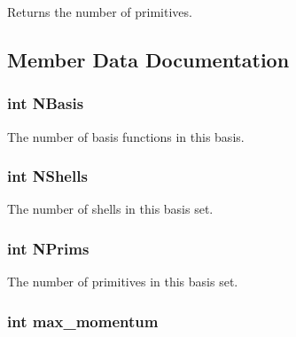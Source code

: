 Returns the number of primitives. 

\subsection{Member Data Documentation}
\hypertarget{classJKBuilder_1_1BasisSet_a41e2bc1e52da2859eabe6586e4451663}{
\subsubsection[{NBasis}]{\setlength{\rightskip}{0pt plus 5cm}int {\bf NBasis}}}
\label{classJKBuilder_1_1BasisSet_a41e2bc1e52da2859eabe6586e4451663}


The number of basis functions in this basis. \hypertarget{classJKBuilder_1_1BasisSet_a9f13901f058284051a35aabd9d69c6d5}{
\subsubsection[{NShells}]{\setlength{\rightskip}{0pt plus 5cm}int {\bf NShells}}}
\label{classJKBuilder_1_1BasisSet_a9f13901f058284051a35aabd9d69c6d5}


The number of shells in this basis set. \hypertarget{classJKBuilder_1_1BasisSet_ad30990632a28f27018d2b497e263caf1}{
\subsubsection[{NPrims}]{\setlength{\rightskip}{0pt plus 5cm}int {\bf NPrims}}}
\label{classJKBuilder_1_1BasisSet_ad30990632a28f27018d2b497e263caf1}


The number of primitives in this basis set. \hypertarget{classJKBuilder_1_1BasisSet_a8fce14d0246c865eea79bf2869b02997}{
\subsubsection[{max\_\-momentum}]{\setlength{\rightskip}{0pt plus 5cm}int {\bf max\_\-momentum}}}
\label{classJKBuilder_1_1BasisSet_a8fce14d0246c865eea79bf2869b02997}


